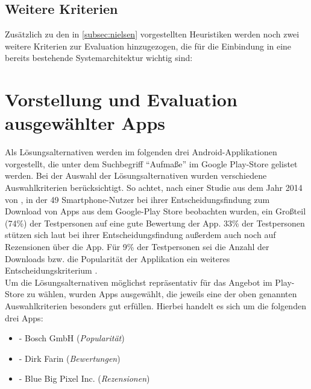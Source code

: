\subsection{Weitere Kriterien}
Zusätzlich zu den in \autoref{subsec:nielsen} vorgestellten Heuristiken werden noch zwei weitere Kriterien zur Evaluation hinzugezogen, die für die Einbindung in eine bereits bestehende Systemarchitektur wichtig sind: 

\begin{itemize}
\end{itemize}

\section{Vorstellung und Evaluation ausgewählter Apps}\label{sec:evaluation}
Als Lösungsalternativen werden im folgenden drei Android-Applikationen vorgestellt, die unter dem Suchbegriff ``Aufmaße'' im Google Play-Store gelistet werden.
Bei der Auswahl der Lösungsalternativen wurden verschiedene Auswahlkriterien berücksichtigt.
So achtet, nach einer Studie aus dem Jahr 2014 von \citeauthor{Dogruel14}, in der 49 Smartphone-Nutzer bei ihrer Entscheidungsfindung zum Download von Apps aus dem Google-Play Store beobachten wurden, ein Großteil (74\%) der Testpersonen auf eine gute Bewertung der App.
33\% der Testpersonen stützen sich laut \citeauthor{Dogruel14} bei ihrer Entscheidungsfindung außerdem auch noch auf Rezensionen über die App.
Für 9\% der Testpersonen sei die Anzahl der Downloads bzw. die Popularität der Applikation ein weiteres Entscheidungskriterium \citep{Dogruel14}. \\

Um die Lösungsalternativen möglichst repräsentativ für das Angebot im Play-Store zu wählen, wurden Apps ausgewählt, die jeweils eine der oben genannten Auswahlkriterien besonders gut erfüllen.
Hierbei handelt es sich um die folgenden drei Apps:

\begin{itemize}
  \item \textbf{\mm{}} - Bosch GmbH (\textit{Popularität})
  \item \textbf{\im{}} - Dirk Farin (\textit{Bewertungen})
  \item \textbf{\pm{}} - Blue Big Pixel Inc. (\textit{Rezensionen})
\end{itemize}

